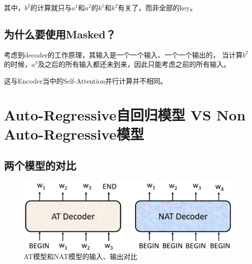 \documentclass[AutoFakeBold]{MyFormat}
\begin{document}
\par 其中，$b^2$的计算就只与$a^1$和$a^2$的$k^1$和$k^2$有关了，而非全部的key。

\section{为什么要使用Masked？}
\par 考虑到decoder的工作原理，其输入是一个一个输入、一个一个输出的，
当计算$b^2$的时候，$a^3$及之后的所有输入都还未到来，因此只能考虑之前的所有输入。
\par 这与Encoder当中的Self-Attention并行计算并不相同。


\chapter{Auto-Regressive自回归模型  VS  Non Auto-Regressive模型}
\section{两个模型的对比}

\begin{figure}[!h]
    \centering
    \includegraphics[width=0.6\linewidth]{figures/2022.05.24/pic6.png}
    \caption{AT模型和NAT模型的输入、输出对比}
\end{figure}
\end{document}
